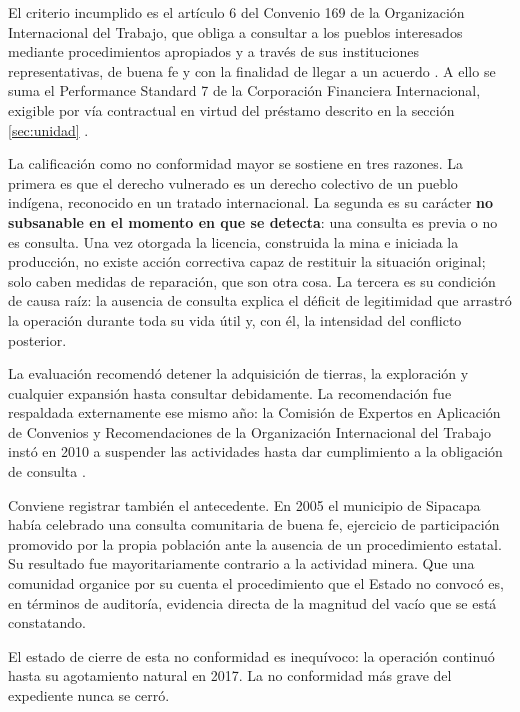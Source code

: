 El criterio incumplido es el artículo 6 del Convenio 169 de la Organización
Internacional del Trabajo, que obliga a consultar a los pueblos interesados
mediante procedimientos apropiados y a través de sus instituciones
representativas, de buena fe y con la finalidad de llegar a un acuerdo
\parencite{oit1989convenio169}. A ello se suma el Performance Standard 7 de la
Corporación Financiera Internacional, exigible por vía contractual en virtud del
préstamo descrito en la sección \ref{sec:unidad} \parencite{ifcsfmarlin}.

La calificación como no conformidad mayor se sostiene en tres razones. La primera
es que el derecho vulnerado es un derecho colectivo de un pueblo indígena,
reconocido en un tratado internacional. La segunda es su carácter \textbf{no
subsanable en el momento en que se detecta}: una consulta es previa o no es
consulta. Una vez otorgada la licencia, construida la mina e iniciada la
producción, no existe acción correctiva capaz de restituir la situación
original; solo caben medidas de reparación, que son otra cosa. La tercera es su
condición de causa raíz: la ausencia de consulta explica el déficit de
legitimidad que arrastró la operación durante toda su vida útil y, con él, la
intensidad del conflicto posterior.

La evaluación recomendó detener la adquisición de tierras, la exploración y
cualquier expansión hasta consultar debidamente. La recomendación fue respaldada
externamente ese mismo año: la Comisión de Expertos en Aplicación de Convenios y
Recomendaciones de la Organización Internacional del Trabajo instó en 2010 a
suspender las actividades hasta dar cumplimiento a la obligación de consulta
\parencite{oncommonground2010hria}.

Conviene registrar también el antecedente. En 2005 el municipio de Sipacapa había
celebrado una consulta comunitaria de buena fe, ejercicio de participación
promovido por la propia población ante la ausencia de un procedimiento estatal.
Su resultado fue mayoritariamente contrario a la actividad minera. Que una
comunidad organice por su cuenta el procedimiento que el Estado no convocó es, en
términos de auditoría, evidencia directa de la magnitud del vacío que se está
constatando.

El estado de cierre de esta no conformidad es inequívoco: la operación continuó
hasta su agotamiento natural en 2017. La no conformidad más grave del expediente
nunca se cerró.

